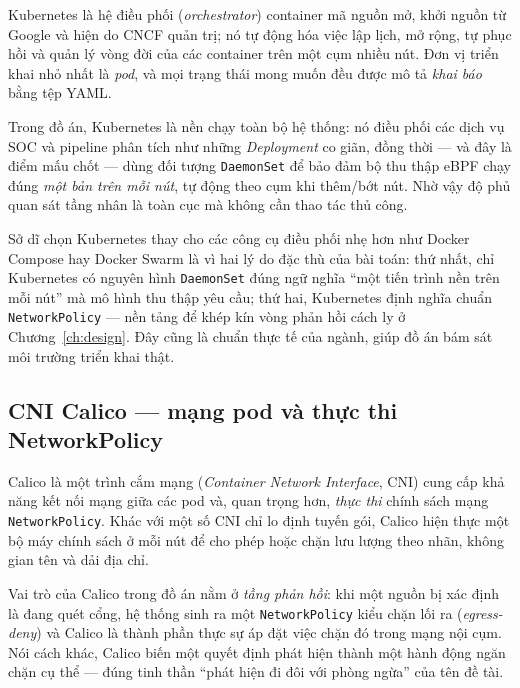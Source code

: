 Kubernetes là hệ điều phối (\textit{orchestrator}) container mã nguồn mở, khởi nguồn từ
Google và hiện do CNCF quản trị; nó tự động hóa việc lập lịch, mở rộng, tự phục hồi và
quản lý vòng đời của các container trên một cụm nhiều nút. Đơn vị triển khai nhỏ nhất là
\textit{pod}, và mọi trạng thái mong muốn đều được mô tả \emph{khai báo} bằng tệp YAML.

Trong đồ án, Kubernetes là nền chạy toàn bộ hệ thống: nó điều phối các dịch vụ SOC và
pipeline phân tích như những \textit{Deployment} co giãn, đồng thời --- và đây là điểm
mấu chốt --- dùng đối tượng \texttt{DaemonSet} để bảo đảm bộ thu thập eBPF chạy đúng
\emph{một bản trên mỗi nút}, tự động theo cụm khi thêm/bớt nút. Nhờ vậy độ phủ quan sát
tầng nhân là toàn cục mà không cần thao tác thủ công.

Sở dĩ chọn Kubernetes thay cho các công cụ điều phối nhẹ hơn như Docker Compose hay Docker
Swarm là vì hai lý do đặc thù của bài toán: thứ nhất, chỉ Kubernetes có nguyên hình
\texttt{DaemonSet} đúng ngữ nghĩa ``một tiến trình nền trên mỗi nút'' mà mô hình thu thập
yêu cầu; thứ hai, Kubernetes định nghĩa chuẩn \texttt{NetworkPolicy} --- nền tảng để khép
kín vòng phản hồi cách ly ở Chương~\ref{ch:design}. Đây cũng là chuẩn thực tế của ngành,
giúp đồ án bám sát môi trường triển khai thật.

\subsection{CNI Calico --- mạng pod và thực thi NetworkPolicy}

Calico là một trình cắm mạng (\textit{Container Network Interface}, CNI) cung cấp khả năng
kết nối mạng giữa các pod và, quan trọng hơn, \emph{thực thi} chính sách mạng
\texttt{NetworkPolicy}. Khác với một số CNI chỉ lo định tuyến gói, Calico hiện thực một bộ
máy chính sách ở mỗi nút để cho phép hoặc chặn lưu lượng theo nhãn, không gian tên và dải
địa chỉ.

Vai trò của Calico trong đồ án nằm ở \emph{tầng phản hồi}: khi một nguồn bị xác định là
đang quét cổng, hệ thống sinh ra một \texttt{NetworkPolicy} kiểu chặn lối ra
(\textit{egress-deny}) và Calico là thành phần thực sự áp đặt việc chặn đó trong mạng nội
cụm. Nói cách khác, Calico biến một quyết định phát hiện thành một hành động ngăn chặn cụ
thể --- đúng tinh thần ``phát hiện đi đôi với phòng ngừa'' của tên đề tài.


